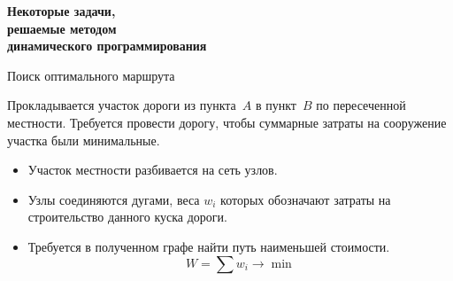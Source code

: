 \documentclass[unicode,11pt,notheorems,xcolor=table]{beamer}
\begin{document}
\begin{frame}{}{}
\centering
\bfseries
\LARGE \color{vgublue} Некоторые задачи,\\ решаемые методом\\ динамического программирования
\end{frame}
\begin{frame}{Поиск оптимального маршрута}{}
\begin{exampleblock}{}
Прокладывается участок дороги из пункта~$A$ в пункт~$B$ по пересеченной местности. 
Требуется провести дорогу, чтобы суммарные затраты на сооружение участка были минимальные. 
\end{exampleblock}

\begin{itemize}
\item
	Участок местности разбивается на сеть узлов.
\item
	Узлы соединяются дугами, веса $w_i$ которых обозначают затраты на строительство данного куска дороги.
\item
	Требуется в полученном графе найти путь наименьшей стоимости. 
	$$
	W= \sum w_i \to \min 
	$$
\end{itemize}
\end{frame}
\end{document}
